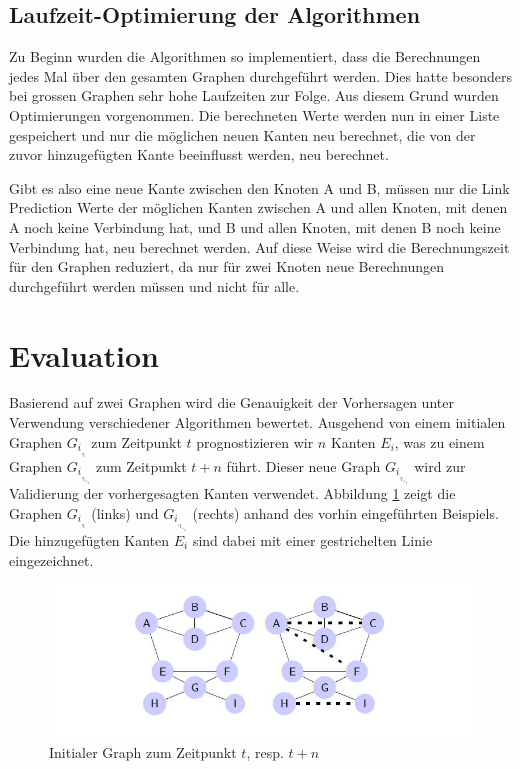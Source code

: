 \subsection{Laufzeit-Optimierung der Algorithmen}
Zu Beginn wurden die Algorithmen so implementiert, dass die Berechnungen jedes Mal über den gesamten Graphen durchgeführt
werden. Dies hatte besonders bei grossen Graphen sehr hohe Laufzeiten zur Folge. Aus diesem Grund wurden Optimierungen
vorgenommen. Die berechneten Werte werden nun in einer Liste gespeichert und nur die möglichen neuen Kanten neu
berechnet, die von der zuvor hinzugefügten Kante beeinflusst werden, neu berechnet.

Gibt es also eine neue Kante zwischen den Knoten A und B, müssen nur die Link Prediction Werte der möglichen Kanten
zwischen A und allen Knoten, mit denen A noch keine Verbindung hat, und B und allen Knoten, mit denen B noch keine
Verbindung hat, neu berechnet werden. Auf diese Weise wird die Berechnungszeit für den Graphen reduziert, da nur für
zwei Knoten neue Berechnungen durchgeführt werden müssen und nicht für alle.

\section{Evaluation}
Basierend auf zwei Graphen wird die Genauigkeit der Vorhersagen unter Verwendung verschiedener Algorithmen bewertet.
Ausgehend von einem initialen Graphen $G_i_,_t$ zum Zeitpunkt $t$ prognostizieren wir $n$ Kanten $E_i$, was zu einem Graphen $G_i_,_t_+_n$ zum Zeitpunkt $t + n$ führt.
Dieser neue Graph $G_i_,_t_+_n$  wird zur Validierung der vorhergesagten Kanten verwendet.
Abbildung \ref{fig:graph_init} zeigt die Graphen $G_i_,_t$ (links) und $G_i_,_t_+_n$ (rechts) anhand des vorhin eingeführten Beispiels.
Die hinzugefügten Kanten $E_i$ sind dabei mit einer gestrichelten Linie eingezeichnet.

\begin{figure}[h]
    \centering
    \includegraphics{resources/graph_init.JPG}
    \caption{Initialer Graph zum Zeitpunkt $t$, resp. $t + n$}
    \label{fig:graph_init}
\end{figure}

